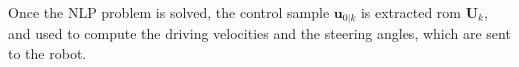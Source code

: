 Once the NLP problem is solved, the control sample $\bm{u}_{0|k}$ is extracted 
rom $\bm{U}_k$, and used to compute the driving velocities and the steering
angles, which are sent to the robot.






